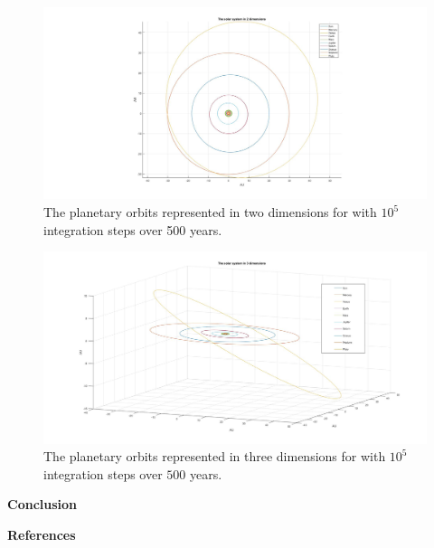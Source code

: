 \documentclass[10pt,a4paper]{article}
\begin{document}
\begin{figure} [h]  

\centerline{\includegraphics[scale=0.40]{2dsolsys.jpg}}
\caption{The planetary orbits represented in two dimensions for with $10^5$ integration steps over 500 years.}

\end{figure}


\begin{figure} [h]

\centerline{\includegraphics[scale=0.35]{3dsolsys.jpg}}
\caption{The planetary orbits represented in three dimensions for with $10^5$ integration steps over $500$ years.}

\end{figure}









\newpage
{\LARGE\bf
Conclusion
}









\newpage
{\LARGE\bf
References
}
\end{document}
